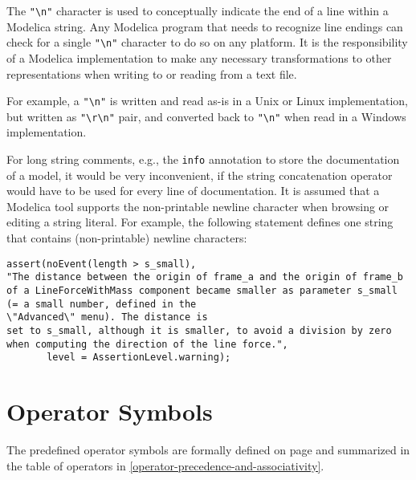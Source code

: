 The \lstinline!"\n"! character is used to conceptually indicate the
end of a line within a Modelica string. Any Modelica program that needs
to recognize line endings can check for a single \lstinline!"\n"!
character to do so on any platform. It is the responsibility of a
Modelica implementation to make any necessary transformations to other
representations when writing to or reading from a text file.

\begin{nonnormative}
For example, a \lstinline!"\n"! is written and read as-is in a Unix or Linux implementation, but written as
\lstinline!"\r\n"! pair, and converted back to \lstinline!"\n"! when read in a Windows implementation.
\end{nonnormative}

\begin{nonnormative}
For long string comments, e.g., the \lstinline!info! annotation to
store the documentation of a model, it would be very inconvenient, if
the string concatenation operator would have to be used for every line
of documentation. It is assumed that a Modelica tool supports the
non-printable newline character when browsing or editing a string
literal. For example, the following statement defines one string that
contains (non-printable) newline characters:
\begin{lstlisting}[language=modelica]
assert(noEvent(length > s_small),
"The distance between the origin of frame_a and the origin of frame_b
of a LineForceWithMass component became smaller as parameter s_small
(= a small number, defined in the
\"Advanced\" menu). The distance is
set to s_small, although it is smaller, to avoid a division by zero
when computing the direction of the line force.",
       level = AssertionLevel.warning);
\end{lstlisting}
\end{nonnormative}

\section{Operator Symbols}\label{operator-symbols}

The predefined operator symbols are formally defined on page \pageref{lexical-conventions} and
summarized in the table of operators in \cref{operator-precedence-and-associativity}.
